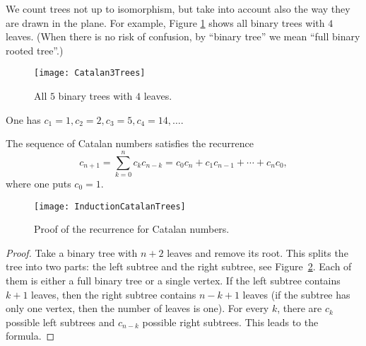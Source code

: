 \begin{page}
\setcounter{section}{4}
\setcounter{subsection}{1}
\setcounter{dfn}{1}
\label{portion:968}

We count trees not up to isomorphism, but take into account also the way they are drawn in the plane.
For example, Figure \ref{fig:Catalan3Trees} shows all binary trees with $4$ leaves.
(When there is no risk of confusion, by ``binary tree'' we mean ``full binary rooted tree''.)

\begin{figure}[ht]
\begin{center}
\texttt{[image: Catalan3Trees]}
\end{center}
\caption{All $5$ binary trees with $4$ leaves.}
\label{fig:Catalan3Trees}
\end{figure}

One has $c_1 = 1, c_2 = 2, c_3 = 5, c_4 = 14, \ldots$.


\end{page}

\begin{page}
\setcounter{section}{4}
\setcounter{subsection}{1}
\setcounter{dfn}{2}
\label{portion:970}

\begin{thm}
The sequence of Catalan numbers satisfies the recurrence
\begin{equation}
\label{eqn:CatalanRecursion}
c_{n+1} = \sum_{k=0}^n c_k c_{n-k} = c_0c_n + c_1c_{n-1} + \cdots + c_nc_0,
\end{equation}
where one puts $c_0 = 1$.
\end{thm}

\end{page}

\begin{page}
\setcounter{section}{4}
\setcounter{subsection}{2}
\setcounter{dfn}{2}
\label{portion:971}


\begin{figure}[ht]
\begin{center}
\texttt{[image: InductionCatalanTrees]}
\end{center}
\caption{Proof of the recurrence for Catalan numbers.}
\label{fig:InductionCatalanTrees}
\end{figure}

\begin{proof}
Take a binary tree with $n+2$ leaves and remove its root.
This splits the tree into two parts: the left subtree and the right subtree, see Figure~\ref{fig:InductionCatalanTrees}.
Each of them is either a full binary tree or a single vertex.
If the left subtree contains $k+1$ leaves, then the right subtree contains $n-k+1$ leaves
(if the subtree has only one vertex, then the number of leaves is one).
For every $k$, there are $c_k$ possible left subtrees and $c_{n-k}$ possible right subtrees.
This leads to the formula.
\end{proof}



\end{page}

